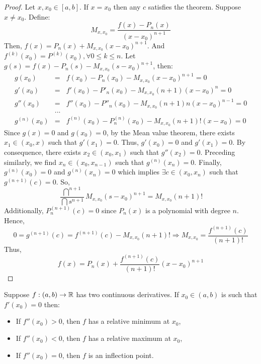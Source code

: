 \begin{proof}
    Let $x, x_0 \in [a,b]$. If $x = x_0$ then any $c$ satisfies the theorem. Suppose $x \neq x_0$. Define:
    \begin{equation*}
        M_{x, x_0} = \frac{f(x) - P_n(x)}{(x-x_0)^{n+1}}
    \end{equation*}
    Then, $f(x) = P_n(x) + M_{x, x_0}(x-x_0)^{n+1}$. And $f^{(k)}(x_0) = P^{(k)}(x_0), \forall 0 \leq k \leq n$. Let $g(s) = f(x) - P_n(s) - M_{x, x_0}(s-x_0)^{n+1}$, then:
    \begin{eqnarray*}
        g(x_0) &=& f(x_0) - P_n(x_0) - M_{x,x_0}(x-x_0)^{n+1} = 0 \\
        g'(x_0) &=& f'(x_0) - P'_n(x_0) - M_{x,x_0}(n+1)(x-x_0)^{n} = 0 \\
        g''(x_0) &=& f''(x_0) - P''_n(x_0) - M_{x,x_0}(n+1)n(x-x_0)^{n-1} = 0 \\
        &...& \\
        g^{(n)}(x_0) &=& f^{(n)}(x_0) - P^{(n)}_n(x_0) - M_{x,x_0}(n+1)!(x-x_0) = 0
    \end{eqnarray*}
    Since $g(x) = 0$ and $g(x_0) = 0$, by the Mean value theorem, there exists $x_1 \in (x_0, x)$ such that $g'(x_1) = 0$. Thus, $g'(x_0) = 0$ and $g'(x_1) = 0$. By consequence, there exists $x_2 \in (x_0, x_1)$ such that $g''(x_2) = 0$. Preceding similarly, we find $x_n \in (x_0, x_{n-1})$ such that $g^{(n)}(x_n) = 0$. Finally, $g^{(n)}(x_0) = 0$ and $g^{(n)}(x_n) = 0$ which implies $\exists c \in (x_0, x_n)$ such that $g^{(n+1)}(c) = 0$. So,
    \begin{equation*}
        \frac{\dint ^{n+1}}{\dint s^{n+1}} M_{x, x_0}(s - x_0)^{n+1} = M_{x, x_0}(n+1)!
    \end{equation*}
    Additionally, $P_n^{(n+1)}(c) = 0$ since $P_n(x)$ is a polynomial with degree $n$. Hence,
    \begin{equation*}
        0 = g^{(n+1)}(c) = f^{(n+1)}(c) - M_{x, x_0}(n+1)! \Longrightarrow M_{x, x_0} = \frac{f^{(n+1)}(c)}{(n+1)!}
    \end{equation*}
    Thus,
    \begin{equation*}
        f(x) = P_n(x) + \frac{f^{(n+1)}(c)}{(n+1)!}(x-x_0)^{n+1}
    \end{equation*}
    
\end{proof}

\begin{theorem}
    Suppose $f: (a,b) \to \mathbb{R}$ has two continuous derivatives. If $x_0 \in (a,b)$ is such that $f'(x_0) = 0$ then:
    \begin{itemize}
        \item If $f''(x_0) > 0$, then $f$ has a relative minimum at $x_0$,
        \item If $f''(x_0) < 0$, then $f$ has a relative maximum at $x_0$,
        \item If $f''(x_0) = 0$, then $f$ is an inflection point.
    \end{itemize}
\end{theorem}

